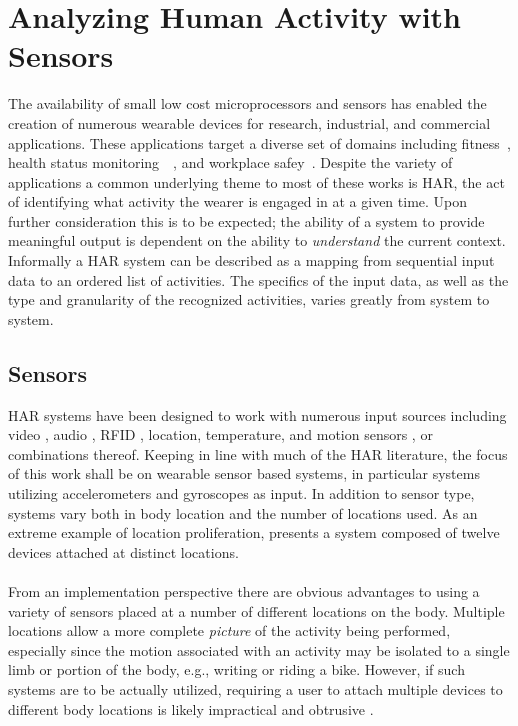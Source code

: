 \documentclass[12pt]{report}
\newcommand{\1}[0]{\mathbbm{1}}
\begin{document}
\chapter{Analyzing Human Activity with Sensors}
\label{chap:Analyzing Human Activity with Sensors}
The availability of small low cost microprocessors and sensors has
enabled the creation of numerous wearable devices for research, industrial,
and commercial applications. These applications target a diverse set of domains
including fitness~\cite{long-term-devices},
health status monitoring~\cite{elderly}~\cite{health-survey},
and workplace safey~\cite{assembly-activity}.
Despite the variety of applications a common underlying theme to most of these
works is \ac{HAR}, the act of identifying what activity the wearer is engaged in at a given time.
Upon further consideration this is to be expected; the ability of a system to provide
meaningful output is dependent on the ability to \emph{understand} the current context.
Informally a \ac{HAR} system can be described as a mapping from sequential
input data to an ordered list of activities. The specifics of the input data, as well
as the type and granularity of the recognized activities, varies greatly from system to system.

\section{Sensors}
\label{sec:Sensors}
\ac{HAR} systems have been designed to work with numerous input sources including
video \cite{har-vision-survey},
audio \cite{assembly-activity},
RFID \cite{har-video-rfid},
location, temperature, and motion sensors \cite{har-survey},
or combinations thereof.
Keeping in line with much of the \ac{HAR} literature,
the focus of this work shall be on wearable sensor based systems,
in particular systems utilizing accelerometers and gyroscopes \cite{multiple-sensor-bao}
as input. In addition to sensor type, systems vary both in body location
and the number of locations used. As an extreme example of location proliferation,
\cite{many-sensor-locations} presents a system composed of twelve devices attached
at distinct locations.
\\\\
From an implementation perspective there are obvious advantages to using a
variety of sensors placed at a number of different locations on the body. Multiple
locations allow a more complete \emph{picture} of the activity being performed,
especially since the motion associated with an activity may be isolated to a
single limb or portion of the body, e.g., writing or riding a bike. However, if such
systems are to be actually utilized, requiring a user to attach multiple devices to
different body locations is likely impractical and obtrusive \cite{har-survey}.
\end{document}
